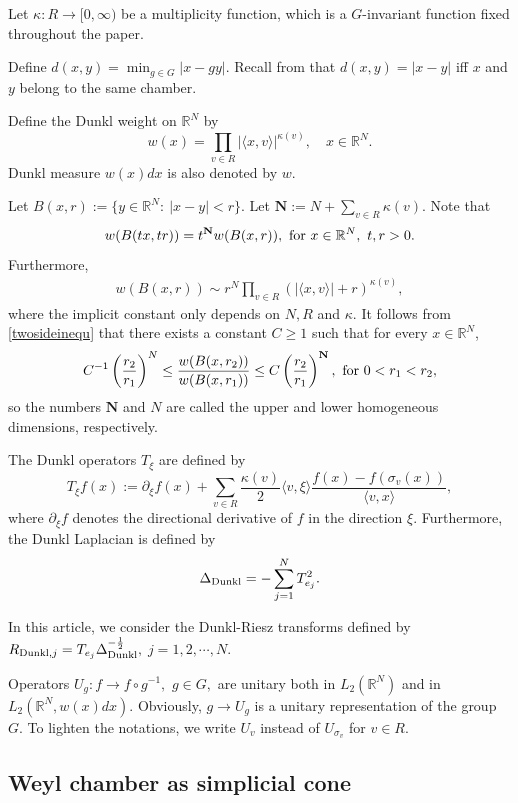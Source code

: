 \documentclass{amsart}
\begin{document}
Let $\kappa: R \to [0,\infty)$ be a multiplicity function, which is a $G$-invariant function  fixed throughout the paper.

Define $d(x,y)=\min_{g\in G}|x-gy|.$ Recall from \cite[Chapter VII, proof of Theorem 2.12]{MR514561} that $d(x,y)=|x-y|$ iff $x$ and $y$ belong to the same chamber.

Define the Dunkl weight on $\mathbb{R}^N$ by
$$w(x)=\prod_{v\in R} |\langle x,v\rangle|^{\kappa(v)},\quad x\in\mathbb{R}^N.$$
Dunkl measure $w(x)dx$ is also denoted by $w.$

Let $B(x,r):=\{y\in \mathbb{R}^N:\ |x-y|< r\}.$ Let $\mathbf{N}:=N+\sum_{v\in R}\kappa(v)$. Note that
$$w(B(tx,tr))=t^{\mathbf{N}}w(B(x,r)),\ {\rm for}\ x\in\mathbb{R}^N,\ t,r>0.$$
Furthermore,
\begin{align}\label{twosideinequ}
  w(B(x,r))\sim r^N \prod_{v \in R}(|\langle x, v \rangle |+r)^{\kappa(v)},
\end{align}
where the implicit constant only depends on $N,R$ and $\kappa.$  It follows from \eqref{twosideinequ} that there exists a constant $C\geq 1$ such that for every $x\in \mathbb{R}^N$,
\begin{align}\label{doublinginequality}
C^{-1}\left(\frac{r_2}{r_1}\right)^N\leq \frac{w(B(x,r_2))}{w(B(x,r_1))}\leq C\left(\frac{r_2}{r_1}\right)^{\mathbf{N}},\ {\rm for}\ 0<r_1<r_2,
\end{align}
so the numbers $\mathbf{N}$ and $N$ are called the upper and lower homogeneous dimensions, respectively.

The Dunkl operators $T_\xi$ are defined by
$$T_\xi f(x):=\partial_\xi f(x)+\sum_{v\in R}\frac{\kappa(v)}{2}\langle v,\xi\rangle\frac{f(x)-f(\sigma_v(x))}{\langle v,x\rangle},$$
where $\partial_\xi f$ denotes the directional derivative of $f$ in the direction $\xi$. Furthermore, the Dunkl Laplacian is defined by
$$\Delta_{{\rm Dunkl}}=-\sum_{j=1}^N T_{e_j}^2.$$

In this article, we consider the Dunkl-Riesz transforms defined by $R_{{\rm Dunkl},j}=T_{e_j}\Delta_{{\rm Dunkl}}^{-\frac12},$ $j=1,2,\cdots,N.$

Operators $U_g:f\to f\circ g^{-1},$ $g\in G,$ are unitary both in $L_2(\mathbb{R}^N)$ and in $L_2(\mathbb{R}^N,w(x)dx).$ Obviously, $g\to U_g$ is a unitary representation of the group $G.$ To lighten the notations, we write $U_v$ instead of $U_{\sigma_v}$ for $v\in R.$

\subsection{Weyl chamber as simplicial cone}
\end{document}

